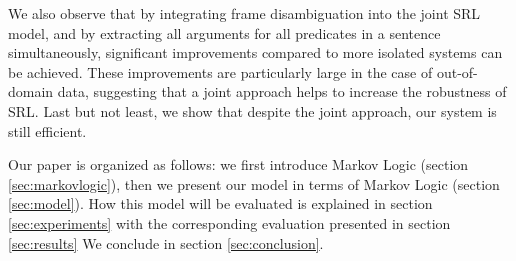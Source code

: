 
We also observe that by integrating frame disambiguation into the
joint SRL model, and by extracting all arguments for all predicates in a
sentence simultaneously, significant improvements compared to more isolated systems can be achieved. These improvements are particularly large in
the case of out-of-domain data, suggesting that a joint approach helps
to increase the robustness of SRL.
Last but not least, we show that despite the joint approach, our
system is still efficient. 

Our paper is organized as follows: we first introduce Markov Logic (section
\ref{sec:markovlogic}),
then we present our model in terms of Markov Logic (section \ref{sec:model}). How this model
will be evaluated is explained in section \ref{sec:experiments} with the corresponding
evaluation presented in section \ref{sec:results} We conclude in section
\ref{sec:conclusion}.



